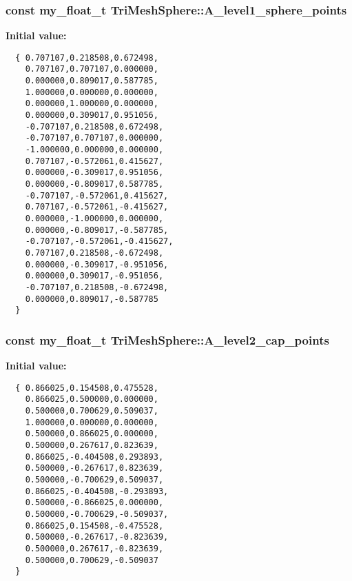 \subsubsection{\setlength{\rightskip}{0pt plus 5cm}const my\_\-float\_\-t Tri\-Mesh\-Sphere::A\_\-level1\_\-sphere\_\-points\hspace{0.3cm}{\tt  [static, private]}}\label{classASCbase_1_1geometry_1_1TriMeshSphere_3f273941f74164c78f9338072e17f6e1}


\textbf{Initial value:}

\begin{Code}\begin{verbatim}
  { 0.707107,0.218508,0.672498,
    0.707107,0.707107,0.000000,
    0.000000,0.809017,0.587785,
    1.000000,0.000000,0.000000,
    0.000000,1.000000,0.000000,
    0.000000,0.309017,0.951056,
    -0.707107,0.218508,0.672498,
    -0.707107,0.707107,0.000000,
    -1.000000,0.000000,0.000000,
    0.707107,-0.572061,0.415627,
    0.000000,-0.309017,0.951056,
    0.000000,-0.809017,0.587785,
    -0.707107,-0.572061,0.415627,
    0.707107,-0.572061,-0.415627,
    0.000000,-1.000000,0.000000,
    0.000000,-0.809017,-0.587785,
    -0.707107,-0.572061,-0.415627,
    0.707107,0.218508,-0.672498,
    0.000000,-0.309017,-0.951056,
    0.000000,0.309017,-0.951056,
    -0.707107,0.218508,-0.672498,
    0.000000,0.809017,-0.587785
  }
\end{verbatim}\end{Code}
\subsubsection{\setlength{\rightskip}{0pt plus 5cm}const my\_\-float\_\-t Tri\-Mesh\-Sphere::A\_\-level2\_\-cap\_\-points\hspace{0.3cm}{\tt  [static, private]}}\label{classASCbase_1_1geometry_1_1TriMeshSphere_a007ec03a3a5930ee56566c87f2a2772}


\textbf{Initial value:}

\begin{Code}\begin{verbatim}
  { 0.866025,0.154508,0.475528,
    0.866025,0.500000,0.000000,
    0.500000,0.700629,0.509037,
    1.000000,0.000000,0.000000,
    0.500000,0.866025,0.000000,
    0.500000,0.267617,0.823639,
    0.866025,-0.404508,0.293893,
    0.500000,-0.267617,0.823639,
    0.500000,-0.700629,0.509037,
    0.866025,-0.404508,-0.293893,
    0.500000,-0.866025,0.000000,
    0.500000,-0.700629,-0.509037,
    0.866025,0.154508,-0.475528,
    0.500000,-0.267617,-0.823639,
    0.500000,0.267617,-0.823639,
    0.500000,0.700629,-0.509037
  }
\end{verbatim}\end{Code}
